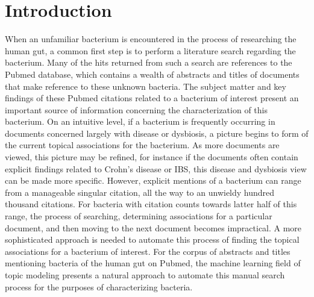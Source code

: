 \documentclass{bioinfo}
\begin{document}
\maketitle

\section{Introduction}
When an unfamiliar bacterium is encountered in the process of researching the human gut, a common first step is to perform a literature search regarding the bacterium. Many of the hits returned from such a search are references to the Pubmed database, which contains a wealth of abstracts and titles of documents that make reference to these unknown bacteria. The subject matter and key findings of these Pubmed citations related to a bacterium of interest present an important source of information concerning the characterization of this bacterium. On an intuitive level, if a bacterium is frequently occurring in documents concerned largely with disease or dysbiosis, a picture begins to form of the current topical associations for the bacterium. As more documents are viewed, this picture may be refined, for instance if the documents often contain explicit findings related to Crohn's disease or IBS, this disease and dysbiosis view can be made more specific. However, explicit mentions of a bacterium can range from a manageable singular citation, all the way to an unwieldy hundred thousand citations. For bacteria with citation counts towards latter half of this range, the process of searching, determining associations for a particular document, and then moving to the next document becomes impractical. A more sophisticated approach is needed to automate this process of finding the topical associations for a bacterium of interest. For the corpus of abstracts and titles mentioning bacteria of the human gut on Pubmed, the machine learning field of topic modeling presents a natural approach to automate this manual search process for the purposes of characterizing bacteria. \\ 
\end{document}
